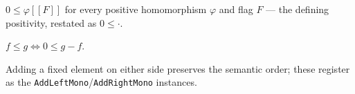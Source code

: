 \begin{lemma}
  \label{lem:positivehom-basisvector-nonneg}
  \leanok
  $0 \le \varphi[\![F]\!]$ for every positive homomorphism $\varphi$ and flag
  $F$ --- the defining positivity, restated as $0 \le \cdot$.
\end{lemma}

\begin{lemma}
  \label{lem:flag-sub-nonneg}
  \leanok
  $f \le g \iff 0 \le g - f$.
\end{lemma}

\begin{lemma}
  \label{lem:order-monotone-sides}
  \leanok
  Adding a fixed element on either side preserves the semantic order; these
  register as the \texttt{AddLeftMono}/\texttt{AddRightMono} instances.
\end{lemma}













